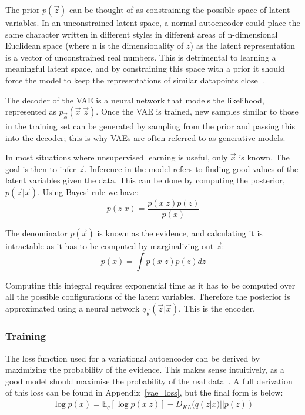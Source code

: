 The prior $p(\vec{z})$ can be thought of as constraining the possible space of latent variables. In an unconstrained latent space, a
normal autoencoder could place the same character written in different styles in different areas of n-dimensional Euclidean space (where n is the 
dimensionality of $z$) as the latent representation is a vector of unconstrained real numbers. This is detrimental to learning a meaningful 
latent space, and by constraining this space with a prior it should force the model to keep the representations of similar datapoints close~\cite{Tutorial70:online}.

The decoder of the VAE is a neural network that models the likelihood, represented as $p_{\vec{\phi}}(\vec{x}|\vec{z})$. Once the VAE is 
trained, new samples similar to 
those in the training set can be generated by sampling from the prior and passing this into the decoder; this is why VAEs are often
referred to as generative models.

In most situations where unsupervised learning is useful, only $\vec{x}$ is known. The goal is then to infer $\vec{z}$.
Inference in the model refers to finding good values of the latent variables given the data. This can be done by computing the
posterior, $p(\vec{z}|\vec{x})$. Using Bayes' rule we have:
\begin{equation}
  p(z|x) = \frac{p(x|z)p(z)}{p(x)}
\end{equation}

The denominator $p(\vec{x})$ is known as the evidence, and calculating it is intractable as it has to be computed by marginalizing out $\vec{z}$:
\begin{equation}
  p(x) = \int p(x|z)p(z) dz
\end{equation}

Computing this integral requires exponential time as it has to be computed over all the possible configurations of
the latent variables. Therefore the posterior is approximated using a neural network $q_{\vec{\theta}}(\vec{z}|\vec{x})$. 
This is the encoder.

\subsubsection{Training}

The loss function used for a variational autoencoder can be derived by maximizing the probability of the evidence.
This makes sense intuitively, as a good model should maximise the probability of the real data~\cite{SVIPartI90:online}. A full derivation
of this loss can be found in Appendix~\ref{vae_loss}, but the final form is below:
\begingroup
\allowdisplaybreaks
\begin{align}
  \log p(x) = \mathbb{E}_q [\log p(x|z)] - D_{KL}(q(z|x)||p(z))
\end{align}
\endgroup

